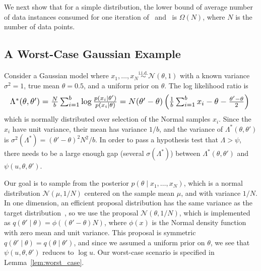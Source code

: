 \documentclass[twoside]{article} \usepackage{aistats2017}
\newcommand{\simiid}{\overset{\textrm{i.i.d.}}{\sim}}
\begin{document}
We next show that for a simple distribution, the lower bound of average
number of data instances consumed for one iteration of~\citet{cutting_mh_2014}
and~\citet{icml2014c1_bardenet14} is $\Omega(N)$, where $N$ is the number of data
points.

\subsection{A Worst-Case Gaussian Example}\label{ssec:gaussian_example}
Consider a Gaussian model where $x_1,\ldots,x_N \simiid \mathcal{N}(\theta,1)$
with a known variance $\sigma^2=1$, true mean $\theta=0.5$, and a uniform prior
on $\theta$. The log likelihood ratio is
\begin{equation}\label{eq:lemma_ll_ratio}
\resizebox{\linewidth}{!}{%
$\Lambda^*(\theta,\theta') =  \frac{N}{b}\sum_{i=1}^b \log\frac{p(x_i|\theta')}{p(x_i|\theta)} = N(\theta'-\theta)\left(\frac{1}{b}\sum_{i=1}^b x_i-\theta-\frac{\theta'-\theta}{2}\right)$
}%
\end{equation}
which is normally distributed over selection of the Normal samples $x_i$.  Since
the $x_i$ have unit variance, their mean has variance $1/b$, and the variance of
$\Lambda^*(\theta,\theta')$ is $\sigma^2(\Lambda^*) = (\theta'-\theta)^2N^2/b$.
In order to pass a hypothesis test that $\Lambda > \psi$, there needs to be a
large enough gap (several $\sigma(\Lambda^*)$) between
$\Lambda^*(\theta,\theta')$ and $\psi(u,\theta,\theta')$. 

Our goal is to sample from the posterior $p(\theta \mid x_1,\ldots,x_N)$, which
is a normal distribution $\mathcal{N}(\mu, 1/N)$ centered on the sample mean
$\mu$, and with variance $1/N$. In one dimension, an efficient proposal
distribution has the same variance as the target
distribution~\citep{OptimalScaling01}, so we use the proposal
$\mathcal{N}(\theta,1/N)$, which is implemented as
$q(\theta'\mid\theta)=\phi((\theta'-\theta)N)$, where $\phi(x)$ is the Normal
density function with zero mean and unit variance. This proposal is symmetric
$q(\theta'\mid\theta)=q(\theta\mid\theta')$, and since we assumed a uniform
prior on $\theta$, we see that $\psi(u,\theta,\theta')$ reduces to $\log u$. Our
worst-case scenario is specified in Lemma~\ref{lem:worst_case}.
\end{document}
